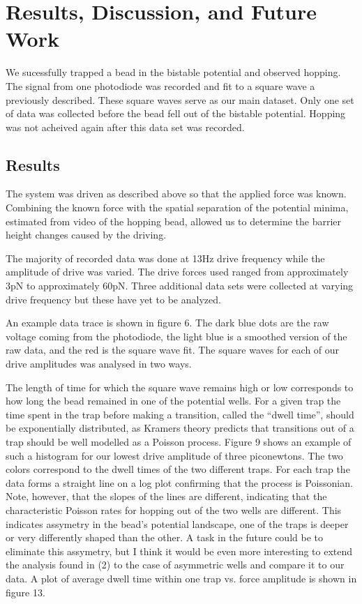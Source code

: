 \documentclass{report}
\begin{document}
\chapter{Results, Discussion, and Future Work}

We sucessfully trapped a bead in the bistable potential and observed hopping. The signal from one photodiode was recorded and fit to a square wave a previously described. These square waves serve as our main dataset. Only one set of data was collected before the bead fell out of the bistable potential. Hopping was not acheived again after this data set was recorded.

\section{Results}

The system was driven as described above so that the applied force was known. Combining the known force with the spatial separation of the potential minima, estimated from video of the hopping bead, allowed us to determine the barrier height changes caused by the driving.

The majority of recorded data was done at 13Hz drive frequency while the amplitude of drive was varied. The drive forces used ranged from approximately 3pN to approximately 60pN. Three additional data sets were collected at varying drive frequency but these have yet to be analyzed.

An example data trace is shown in figure 6. The dark blue dots are the raw voltage coming from the photodiode, the light blue is a smoothed version of the raw data, and the red is the square wave fit. The square waves for each of our drive amplitudes was analysed in two ways.

The length of time for which the square wave remains high or low corresponds to how long the bead remained in one of the potential wells. For a given trap the time spent in the trap before making a transition, called the ``dwell time'', should be exponentially distributed, as Kramers theory predicts that transitions out of a trap should be well modelled as a Poisson process. Figure 9 shows an example of such a histogram for our lowest drive amplitude of three piconewtons. The two colors correspond to the dwell times of the two different traps. For each trap the data forms a straight line on a log plot confirming that the process is Poissonian. Note, however, that the slopes of the lines are different, indicating that the characteristic Poisson rates for hopping out of the two wells are different. This indicates assymetry in the bead's potential landscape, one of the traps is deeper or very differently shaped than the other. A task in the future could be to eliminate this assymetry, but I think it would be even more interesting to extend the analysis found in (2) to the case of asymmetric wells and compare it to our data. A plot of average dwell time within one trap vs. force amplitude is shown in figure 13.
\end{document}
